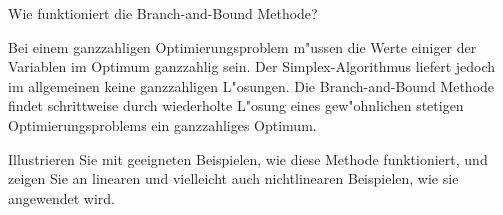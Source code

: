 \begin{aufgabe}
Wie funktioniert die Branch-and-Bound Methode?
\end{aufgabe}

{\parindent 0pt 
Bei} einem ganzzahligen Optimierungsproblem m"ussen die Werte einiger
der Variablen im Optimum ganzzahlig sein. Der Simplex-Algorithmus liefert
jedoch im allgemeinen keine ganzzahligen L"osungen.
Die Branch-and-Bound
Methode findet schrittweise durch wiederholte L"osung eines gew"ohnlichen
stetigen Optimierungsproblems ein ganzzahliges Optimum.

Illustrieren Sie mit geeigneten Beispielen, wie diese Methode
funktioniert, und zeigen Sie an linearen und vielleicht
auch nichtlinearen Beispielen, wie sie angewendet wird.

